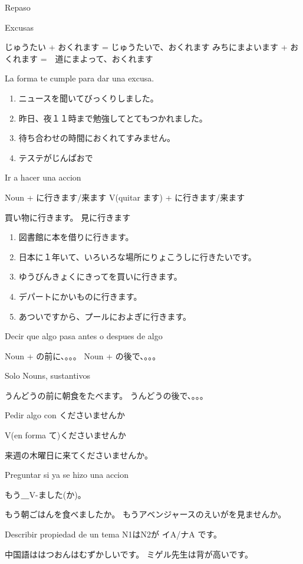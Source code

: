 Repaso

Excusas

じゅうたい + おくれます = じゅうたいで、おくれます
みちにまよいます + おくれます =　道にまよって、おくれます

La forma te cumple para dar una excusa.

\begin{enumerate}
  \item ニュースを聞いてびっくりしました。
  \item 昨日、夜１１時まで勉強してとてもつかれました。
  \item 待ち合わせの時間におくれてすみません。
  \item テステがじんぱおで
\end{enumerate}

Ir a hacer una accion

Noun + に行きます/来ます
V(quitar ます) + に行きます/来ます

買い物に行きます。
見に行きます

\begin{enumerate}
  \item 図書館に本を借りに行きます。
  \item 日本に１年いて、いろいろな場所にりょこうしに行きたいです。
  \item ゆうびんきょくにきってを買いに行きます。
  \item デパートにかいものに行きます。
  \item あついですから、プールにおよぎに行きます。
\end{enumerate}

Decir que algo pasa antes o despues de algo

Noun + の前に、。。。
Noun + の後で、。。。

Solo Nouns, sustantivos

うんどうの前に朝食をたべます。
うんどうの後で、。。。

Pedir algo con くださいませんか

V(en forma て)くださいませんか

来週の木曜日に来てくださいませんか。


Preguntar si ya se hizo una accion

もう＿V-ました(か)。

もう朝ごはんを食べましたか。
もうアベンジャースのえいがを見ませんか。

Describir propiedad de un tema
N1はN2が イA/ナA です。

中国語ははつおんはむずかしいです。
ミゲル先生は背が高いです。

